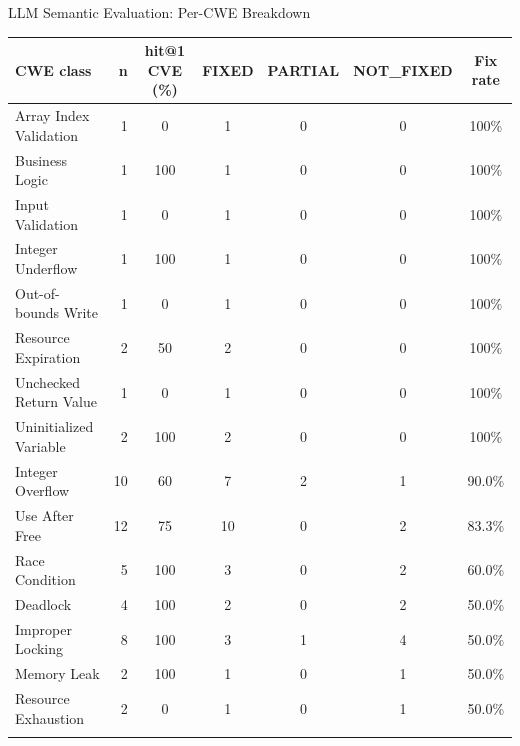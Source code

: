 \documentclass[aspectratio=169,10pt]{beamer}
\newcommand{\chit}[1]{\cellcolor{hit!30} #1}
\newcommand{\cmiss}[1]{\cellcolor{miss!25} #1}
\newcommand{\cwarn}[1]{\cellcolor{warn!30} #1}
\begin{document}
\begin{frame}{LLM Semantic Evaluation: Per-CWE Breakdown}

  \centering
  \vspace{-0.4em}
  {\tiny
  \renewcommand{\arraystretch}{1.15}
  \setlength{\tabcolsep}{3pt}
  \begin{tabular}{l r c c c c c}
    \toprule
    \textbf{CWE class}
      & \textbf{n}
      & \textbf{hit@1 CVE (\%)}
      & \textbf{FIXED}
      & \textbf{PARTIAL}
      & \textbf{NOT\_FIXED}
      & \textbf{Fix rate} \\
    \midrule
    \rowcolor{hit!8}
    Array Index Validation     & 1  & \cmiss{0}   & 1 & 0 & 0 & \chit{100\%} \\
    \rowcolor{hit!8}
    Business Logic             & 1  & \chit{100}  & 1 & 0 & 0 & \chit{100\%} \\
    \rowcolor{hit!8}
    Input Validation           & 1  & \cmiss{0}   & 1 & 0 & 0 & \chit{100\%} \\
    \rowcolor{hit!8}
    Integer Underflow          & 1  & \chit{100}  & 1 & 0 & 0 & \chit{100\%} \\
    \rowcolor{hit!8}
    Out-of-bounds Write        & 1  & \cmiss{0}   & 1 & 0 & 0 & \chit{100\%} \\
    \rowcolor{hit!8}
    Resource Expiration        & 2  & \cwarn{50}  & 2 & 0 & 0 & \chit{100\%} \\
    \rowcolor{hit!8}
    Unchecked Return Value     & 1  & \cmiss{0}   & 1 & 0 & 0 & \chit{100\%} \\
    \rowcolor{hit!8}
    Uninitialized Variable     & 2  & \chit{100}  & 2 & 0 & 0 & \chit{100\%} \\
    \addlinespace[2pt]
    Integer Overflow           & 10 & \cwarn{60}  & 7 & 2 & 1 & \chit{90.0\%} \\
    Use After Free             & 12 & \cwarn{75}  & 10 & 0 & 2 & \chit{83.3\%} \\
    Race Condition             & 5  & \chit{100}  & 3 & 0 & 2 & 60.0\% \\
    Deadlock                   & 4  & \chit{100}  & 2 & 0 & 2 & 50.0\% \\
    Improper Locking           & 8  & \chit{100}  & 3 & 1 & 4 & 50.0\% \\
    Memory Leak                & 2  & \chit{100}  & 1 & 0 & 1 & 50.0\% \\
    Resource Exhaustion        & 2  & \cmiss{0}   & 1 & 0 & 1 & 50.0\% \\
    \addlinespace[2pt]
    \rowcolor{miss!8}

\end{tabular}}
\end{frame}
\end{document}
